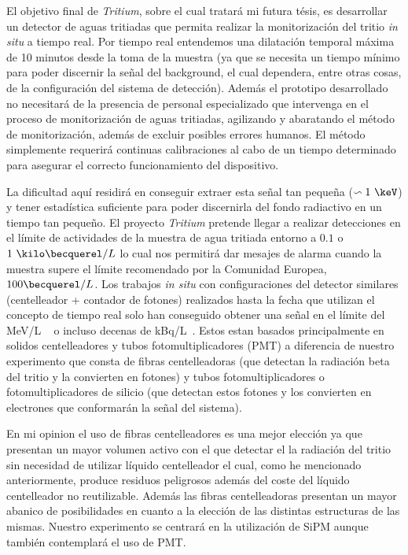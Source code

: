 El objetivo final de \textit{Tritium}, sobre el cual tratará mi futura tésis, es desarrollar un detector de aguas tritiadas que permita realizar la monitorización del tritio \textit{in situ} a tiempo real. Por tiempo real entendemos una dilatación temporal máxima de 10 minutos desde la toma de la muestra (ya que se necesita un tiempo mínimo para poder discernir la señal del background, el cual dependera, entre otras cosas, de la configuración del sistema de detección). Además el prototipo desarrollado no necesitará de la presencia de personal especializado que intervenga en el proceso de monitorización de aguas tritiadas, agilizando y abaratando el método de monitorización, además de excluir posibles errores humanos. El método simplemente requerirá continuas calibraciones al cabo de un tiempo determinado para asegurar el correcto funcionamiento del dispositivo. 

La dificultad aquí residirá en conseguir extraer esta señal tan pequeña ($\backsim 1~\keV$) y tener estadística suficiente para poder discernirla del fondo radiactivo en un tiempo tan pequeño. El proyecto \textit{Tritium} pretende llegar a realizar detecciones en el límite de actividades de la muestra de agua tritiada entorno a $0.1$ o $1~\kilo\becquerel/L$ lo cual nos permitirá dar mesajes de alarma cuando la muestra supere el límite recomendado por la Comunidad Europea, $100\becquerel/L$. Los trabajos \textit{in situ} con configuraciones del detector similares (centelleador + contador de fotones) realizados hasta la fecha que utilizan el concepto de tiempo real solo han conseguido obtener una señal en el límite del MeV/L ~\cite{TesisTritio} o incluso decenas de kBq/L~\cite{Rat}. Estos estan basados principalmente en solidos centelleadores y tubos fotomultiplicadores (PMT) a diferencia de nuestro experimento que consta de fibras centelleadoras (que detectan la radiación beta del tritio y la convierten en fotones) y tubos fotomultiplicadores o fotomultiplicadores de silicio (que detectan estos fotones y los convierten en electrones que conformarán la señal del sistema). 

En mi opinion el uso de fibras centelleadores es una mejor elección ya que presentan un mayor volumen activo con el que detectar el la radiación del tritio  sin necesidad de utilizar líquido centelleador el cual, como he mencionado anteriormente, produce residuos peligrosos además del coste del líquido centelleador no reutilizable. Además las fibras centelleadoras presentan un mayor abanico de posibilidades en cuanto a la elección de las distintas estructuras de las mismas. Nuestro experimento se centrará en la utilización de SiPM aunque también contemplará el uso de PMT. 

